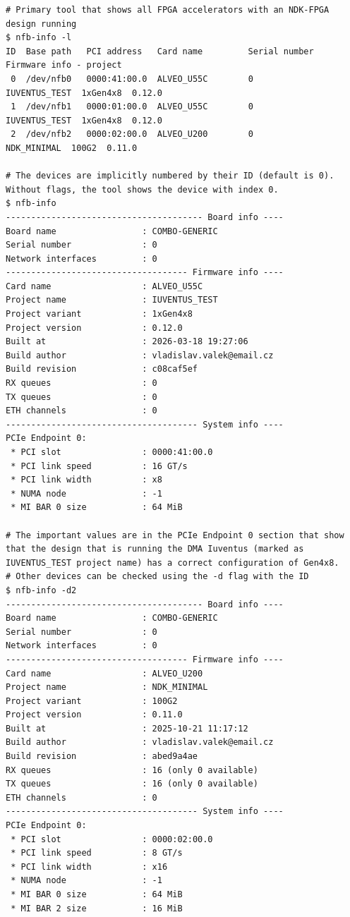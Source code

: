 \begin{lstlisting}[caption={Showing running devices using NDK-SW tools}]
# Primary tool that shows all FPGA accelerators with an NDK-FPGA design running
$ nfb-info -l
ID  Base path   PCI address   Card name         Serial number   Firmware info - project
 0  /dev/nfb0   0000:41:00.0  ALVEO_U55C        0               IUVENTUS_TEST  1xGen4x8  0.12.0
 1  /dev/nfb1   0000:01:00.0  ALVEO_U55C        0               IUVENTUS_TEST  1xGen4x8  0.12.0
 2  /dev/nfb2   0000:02:00.0  ALVEO_U200        0               NDK_MINIMAL  100G2  0.11.0

# The devices are implicitly numbered by their ID (default is 0). Without flags, the tool shows the device with index 0.
$ nfb-info
--------------------------------------- Board info ----
Board name                 : COMBO-GENERIC
Serial number              : 0
Network interfaces         : 0
------------------------------------ Firmware info ----
Card name                  : ALVEO_U55C
Project name               : IUVENTUS_TEST
Project variant            : 1xGen4x8
Project version            : 0.12.0
Built at                   : 2026-03-18 19:27:06
Build author               : vladislav.valek@email.cz
Build revision             : c08caf5ef
RX queues                  : 0
TX queues                  : 0
ETH channels               : 0
-------------------------------------- System info ----
PCIe Endpoint 0:
 * PCI slot                : 0000:41:00.0
 * PCI link speed          : 16 GT/s
 * PCI link width          : x8
 * NUMA node               : -1
 * MI BAR 0 size           : 64 MiB

# The important values are in the PCIe Endpoint 0 section that show that the design that is running the DMA Iuventus (marked as IUVENTUS_TEST project name) has a correct configuration of Gen4x8.
# Other devices can be checked using the -d flag with the ID
$ nfb-info -d2
--------------------------------------- Board info ----
Board name                 : COMBO-GENERIC
Serial number              : 0
Network interfaces         : 0
------------------------------------ Firmware info ----
Card name                  : ALVEO_U200
Project name               : NDK_MINIMAL
Project variant            : 100G2
Project version            : 0.11.0
Built at                   : 2025-10-21 11:17:12
Build author               : vladislav.valek@email.cz
Build revision             : abed9a4ae
RX queues                  : 16 (only 0 available)
TX queues                  : 16 (only 0 available)
ETH channels               : 0
-------------------------------------- System info ----
PCIe Endpoint 0:
 * PCI slot                : 0000:02:00.0
 * PCI link speed          : 8 GT/s
 * PCI link width          : x16
 * NUMA node               : -1
 * MI BAR 0 size           : 64 MiB
 * MI BAR 2 size           : 16 MiB
\end{lstlisting}

